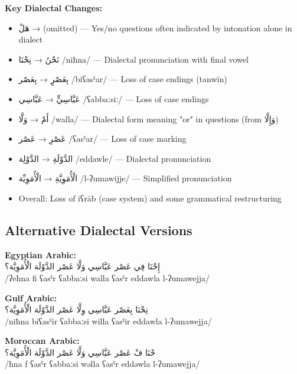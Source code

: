 \documentclass[letterpaper,12pt]{article}
\begin{document}
\textbf{Key Dialectal Changes:}
\begin{itemize}
\item \textarabic{هَلْ} → (omitted) — Yes/no questions often indicated by intonation alone in dialect
\item \textarabic{نَحْنُ} → \textarabic{نِحْنَا} /niħna/ — Dialectal pronunciation with final vowel
\item \textarabic{بِعَصْرٍ} → \textarabic{بِعَصْر} /biʕasˤar/ — Loss of case endings (tanwīn)
\item \textarabic{عَبَّاسِيٍّ} → \textarabic{عَبَّاسِي} /ʕabbaːsiː/ — Loss of case endings
\item \textarabic{أَمْ} → \textarabic{وَلَّا} /walla/ — Dialectal form meaning "or" in questions (from \textarabic{وَإِلَّا})
\item \textarabic{عَصْرِ} → \textarabic{عَصْر} /ʕasˤar/ — Loss of case marking
\item \textarabic{الدَّوْلَةِ} → \textarabic{الدَّوْلِة} /eddawle/ — Dialectal pronunciation
\item \textarabic{الْأُمَوِيَّةِ} → \textarabic{الْأُمَوِيِّة} /l-ʔumawijje/ — Simplified pronunciation
\item Overall: Loss of iʕrāb (case system) and some grammatical restructuring
\end{itemize}

\subsection{Alternative Dialectal Versions}

\textbf{Egyptian Arabic:}\\
\textarabic{إِحْنَا فِي عَصْر عَبَّاسِي وَلَّا عَصْر الدَّوْلَة الْأُمَوِيَّة؟}\\
/ʔeħna fi ʕasˤr ʕabbaːsi walla ʕasˤr eddawla l-ʔumawejja/

\textbf{Gulf Arabic:}\\
\textarabic{نِحْنَا بِعَصْر عَبَّاسِي وِلَّا عَصْر الدَّوْلَة الْأُمَوِيَّة؟}\\
/niħna biʕasˤir ʕabbaːsi willa ʕasˤir eddawla l-ʔumawejja/

\textbf{Moroccan Arabic:}\\
\textarabic{حْنَا فْ عَصْر عَبَّاسِي وَلَّا عَصْر الدَّوْلَة الْأُمَوِيَّة؟}\\
/ħna f ʕasˤr ʕabbaːsi wəlla ʕasˤr eddəwla l-ʔumawejja/ 


\end{document}
